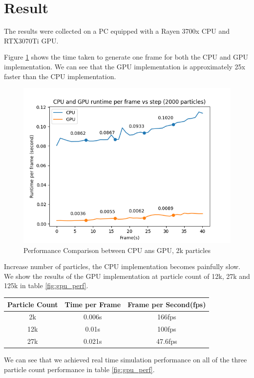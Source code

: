 \documentclass[sigconf]{acmart}
\begin{document}
\section{Result}
The results were collected on a PC equipped with a Rayen 3700x CPU and RTX3070Ti GPU.

Figure \ref{fig:perf} shows the time taken to generate one frame for both the CPU and GPU implementation. We can see that the GPU implementation is approximately 25x faster than the CPU implementation.
\begin{figure}
  \centering
  \includegraphics[width=\linewidth]{image/cpu-gpu-comprasion.png}
  \caption{Performance Comparison between CPU ans GPU, 2k particles}
\label{fig:perf}
\end{figure}

Increase number of particles, the CPU implementation becomes painfully slow. We show the results of the GPU implementation at particle count of 12k, 27k and 125k in table \ref{fig:gpu_perf}.
\begin{center}
  \begin{tabular}{| c | c | c |}
    \hline
    Particle Count & Time per Frame & Frame per Second(fps)  \\
    \hline
    2k & 0.006s & 166fps \\
    \hline
    12k & 0.01s &  100fps \\
    \hline
    27k & 0.021s & 47.6fps \\
    \hline
  \end{tabular}
\end{center}
We can see that we achieved real time simulation performance on all of the three particle count performance in table \ref{fig:gpu_perf}.
\end{document}
